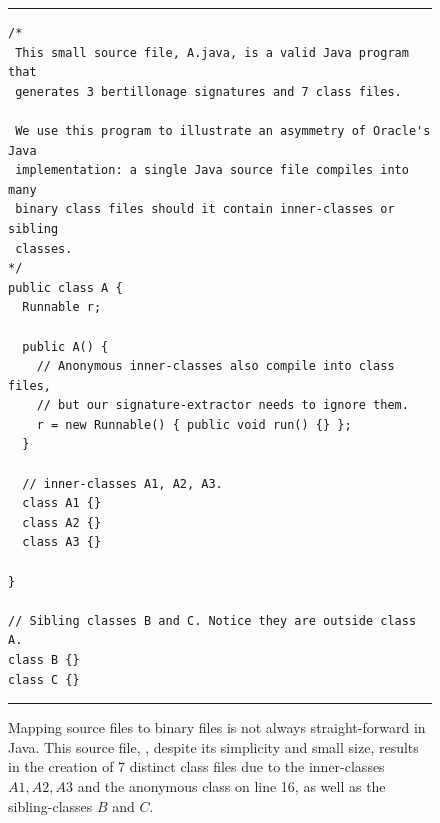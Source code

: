 \begin{figure}
  \centering
  \begin{minipage}[h]{0.88\linewidth}
\hrule
{}
\begin{lstlisting}
/*
 This small source file, A.java, is a valid Java program that
 generates 3 bertillonage signatures and 7 class files.

 We use this program to illustrate an asymmetry of Oracle's Java
 implementation: a single Java source file compiles into many
 binary class files should it contain inner-classes or sibling
 classes.
*/
public class A {
  Runnable r;

  public A() {
    // Anonymous inner-classes also compile into class files,
    // but our signature-extractor needs to ignore them.
    r = new Runnable() { public void run() {} };
  }

  // inner-classes A1, A2, A3.
  class A1 {}
  class A2 {}
  class A3 {}
   
}

// Sibling classes B and C. Notice they are outside class A.
class B {}
class C {}
\end{lstlisting}
\hrule\vspace{1mm}
\end{minipage}
  \caption{\small{Mapping source files to binary files is not always
straight-forward in Java.  This source file, ,
despite its simplicity and small size, results in the
creation of 7 distinct class files due to
the inner-classes $A1, A2, A3$ and the anonymous class on line 16,
as well as the sibling-classes $B$ and $C$.
\vspace{-1em}}}
\label{lst:asym}
\end{figure}

\vspace{-0.5em}

